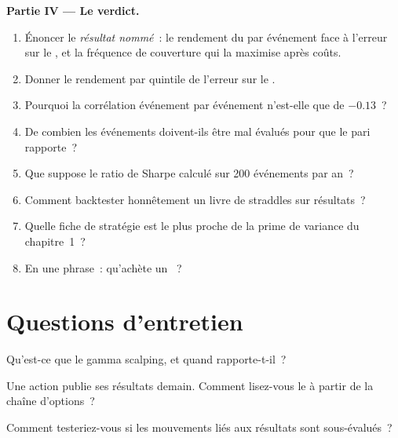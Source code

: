 \begin{problem}
\medskip\noindent\textbf{Partie IV --- Le verdict.}
\begin{enumerate}[resume]
\item Énoncer le \emph{résultat nommé}~: le rendement du  par événement face à l'erreur sur le , et la fréquence de couverture qui
la maximise après coûts.
\item Donner le rendement par quintile de l'erreur sur le .
\item Pourquoi la corrélation événement par événement n'est-elle que de $-0.13$~?
\item De combien les événements doivent-ils être mal évalués pour que le pari rapporte~?
\item Que suppose le ratio de Sharpe calculé sur 200 événements par an~?
\item Comment backtester honnêtement un livre de straddles sur résultats~?
\item Quelle fiche de stratégie est le plus proche de la prime de variance du chapitre~1~?
\item En une phrase~: qu'achète un ~?
\end{enumerate}
\end{problem}

\section{Questions d'entretien}

\begin{interviewq}\label{iq:s2:gamma-scalping-and-event-volatility:1}
Qu'est-ce que le gamma scalping, et quand rapporte-t-il~?
\end{interviewq}

\begin{interviewq}\label{iq:s2:gamma-scalping-and-event-volatility:2}
Une action publie ses résultats demain. Comment lisez-vous le  à partir de la chaîne d'options~?
\end{interviewq}

\begin{interviewq}\label{iq:s2:gamma-scalping-and-event-volatility:3}
Comment testeriez-vous si les mouvements liés aux résultats sont sous-évalués~?
\end{interviewq}

